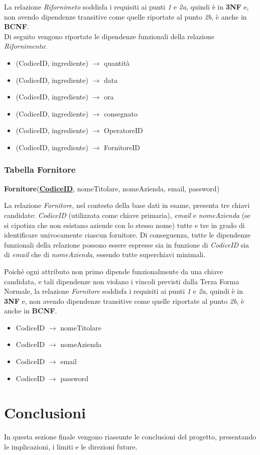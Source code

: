 \documentclass[12pt,a4paper]{article}
\begin{document}
    \noindent
    La relazione \textit{Rifornimeto} soddisfa i requisiti ai punti \textit{1} e \textit{2a}, quindi è in \textbf{3NF} e, non avendo dipendenze transitive come quelle riportate al punto \textit{2b}, è anche in \textbf{BCNF}.\\
    Di seguito vengono riportate le dipendenze funzionali della relazione \textit{Rifornimento}:
    \begin{itemize}[leftmargin=1em, label=$\circ$]
        \item (CodiceID, ingrediente) $\rightarrow$ quantità
        \item (CodiceID, ingrediente) $\rightarrow$ data
        \item (CodiceID, ingrediente) $\rightarrow$ ora
        \item (CodiceID, ingrediente) $\rightarrow$ consegnato
        \item (CodiceID, ingrediente) $\rightarrow$ OperatoreID
        \item (CodiceID, ingrediente) $\rightarrow$ FornitoreID
    \end{itemize}


    \subsubsection*{Tabella Fornitore}
    \begin{tcolorbox}[
        colback=gray!8,
        colframe=black!30,
        title=
    ]
        \textbf{Fornitore}(\textbf{\uline{CodiceID}}, nomeTitolare, nomeAzienda, email, password) 
    \end{tcolorbox}
    
    \noindent
    La relazione \textit{Fornitore}, nel contesto della base dati in esame, presenta tre chiavi candidate: \textit{CodiceID} (utilizzata come chiave primaria), \textit{email} e \textit{nomeAzienda} (se si cipotiza che non esistano aziende con lo stesso nome) tutte e tre in grado di identificare univocamente ciascun fornitore. Di conseguenza, tutte le dipendenze funzionali della relazione possono essere espresse sia in funzione di \textit{CodiceID} sia di \textit{email} che di \textit{nomeAzienda}, essendo tutte superchiavi minimali.

    \vspace{8pt}
    \noindent
    Poiché ogni attributo non primo dipende funzionalmente da una chiave candidata, e tali dipendenze non violano i vincoli previsti dalla Terza Forma Normale, la relazione \textit{Fornitore} soddisfa i requisiti ai punti \textit{1} e \textit{2a}, quindi è in \textbf{3NF} e, non avendo dipendenze transitive come quelle riportate al punto \textit{2b}, è anche in \textbf{BCNF}.
    \begin{itemize}[leftmargin=1em, label=$\circ$]
        \item CodiceID $\rightarrow$ nomeTitolare
        \item CodiceID $\rightarrow$ nomeAzienda
        \item CodiceID $\rightarrow$ email
        \item CodiceID $\rightarrow$ password
    \end{itemize}
    

    \newpage
    \section{Conclusioni}
    In questa sezione finale vengono riassunte le conclusioni del progetto, presentando le implicazioni, i limiti e le direzioni future.
\end{document}
